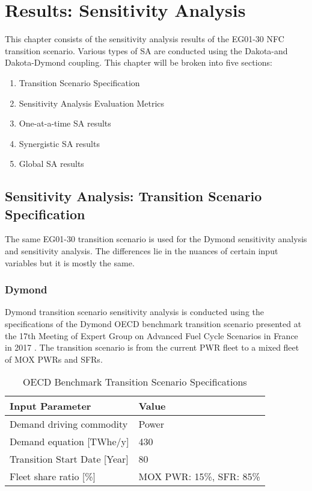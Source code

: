 \chapter{Results: Sensitivity Analysis}
This chapter consists of the sensitivity analysis results of the 
EG01-30 \gls{NFC} transition scenario. 
Various types of \gls{SA} are conducted
using the Dakota-\Cyclus and Dakota-Dymond coupling. 
This chapter will be broken into five sections: 
\begin{enumerate}
    \item Transition Scenario Specification 
    \item Sensitivity Analysis Evaluation Metrics 
    \item One-at-a-time \gls{SA} results 
    \item Synergistic \gls{SA} results
    \item Global \gls{SA} results 
\end{enumerate}

\section{Sensitivity Analysis: Transition Scenario Specification}
The same EG01-30 transition scenario is used for the Dymond 
sensitivity analysis and \Cyclus sensitivity analysis. 
The differences lie in the nuances of certain input variables but 
it is mostly the same. 

\subsection{Dymond}
Dymond transition scenario sensitivity analysis is conducted 
using the specifications of the Dymond OECD benchmark transition 
scenario presented at the 17th Meeting of Expert Group on Advanced 
Fuel Cycle Scenarios in France in 2017 
\cite{oecd_nuclear_energy_agency_wpfc_nodate}. 
The transition scenario is from the current \gls{PWR} fleet to 
a mixed fleet of \gls{MOX} \glspl{PWR} and \glspl{SFR}. 


\begin{table}[]
    \caption{OECD Benchmark Transition Scenario
	Specifications \cite{oecd_nuclear_energy_agency_wpfc_nodate}}
	\label{tab:dymondinputs}
    \footnotesize
    \begin{tabularx}{\textwidth}{LL}
    \hline
                               \textbf{Input Parameter}            & \textbf{Value}            \\ \hline
    Demand driving commodity   & Power              \\
                               Demand equation {[}TWhe/y{]}   & 430        \\
                               Transition Start Date [Year] & 80\\ 
                               Fleet share ratio [\%] & \gls{MOX} \gls{PWR}: 15\%, \gls{SFR}: 85\%\\ \hline
    \end{tabularx}%
    \end{table}

